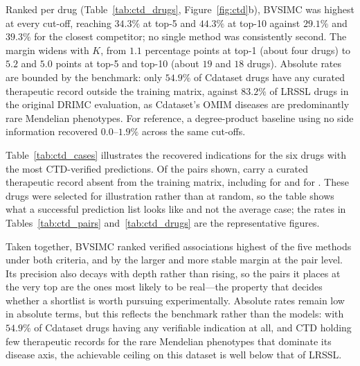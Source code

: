 Ranked per drug (Table~\ref{tab:ctd_drugs}, Figure~\ref{fig:ctd}b), BVSIMC was
highest at every cut-off, reaching $34.3\%$ at top-5 and $44.3\%$ at top-10
against $29.1\%$ and $39.3\%$ for the closest competitor; no single method was
consistently second. The margin widens with $K$, from $1.1$ percentage points at
top-1 (about four drugs) to $5.2$ and $5.0$ points at top-5 and top-10 (about
$19$ and $18$ drugs).  Absolute rates are bounded by the
benchmark: only $54.9\%$ of Cdataset drugs have any curated therapeutic record
outside the training matrix, against $83.2\%$ of LRSSL drugs in the original
DRIMC evaluation, as Cdataset's OMIM diseases are predominantly rare Mendelian
phenotypes. For reference, a degree-product baseline using no side information
recovered $0.0$--$1.9\%$ across the same cut-offs.

Table~\ref{tab:ctd_cases} illustrates the recovered indications for the six
drugs with the most CTD-verified predictions. Of the  pairs shown,
 carry a curated therapeutic record absent from the training matrix,
including  for  and  for .
These drugs were selected for illustration rather than at random, so the table
shows what a successful prediction list looks like and not the average case; the
rates in Tables~\ref{tab:ctd_pairs} and~\ref{tab:ctd_drugs} are the
representative figures.

Taken together, BVSIMC ranked verified associations highest of the five methods
under both criteria, and by the larger and more stable margin at the pair level.
Its precision also decays with depth rather than rising, so the pairs it places
at the very top are the ones most likely to be real---the property that decides
whether a shortlist is worth pursuing experimentally. Absolute rates remain low
in absolute terms, but this reflects the benchmark rather than the models: with
$54.9\%$ of Cdataset drugs having any verifiable indication at all, and CTD
holding few therapeutic records for the rare Mendelian phenotypes that dominate
its disease axis, the achievable ceiling on this dataset is well below that of
LRSSL.

